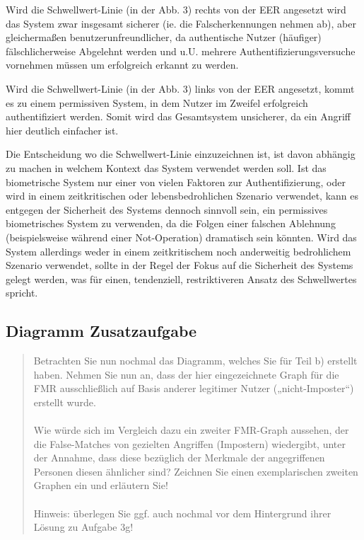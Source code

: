 \documentclass{article}
\newcommand{\annotation}[1]{
    \begin{quote}
    	\begin{textit}{#1}\end{textit}
    \end{quote}
}
\begin{document}
Wird die Schwellwert-Linie (in der Abb. 3) rechts von der EER angesetzt wird das System zwar insgesamt sicherer (ie. die
Falscherkennungen nehmen ab), aber gleichermaßen benutzerunfreundlicher, da authentische Nutzer (häufiger) 
fälschlicherweise Abgelehnt werden und u.U. mehrere Authentifizierungsversuche vornehmen müssen um erfolgreich
erkannt zu werden.

Wird die Schwellwert-Linie (in der Abb. 3) links von der EER angesetzt, kommt es zu einem permissiven System, in dem
Nutzer im Zweifel erfolgreich authentifiziert werden. Somit wird das Gesamtsystem unsicherer, da ein Angriff hier deutlich 
einfacher ist.

Die Entscheidung wo die Schwellwert-Linie einzuzeichnen ist, ist davon abhängig zu machen in welchem Kontext das System
verwendet werden soll. Ist das biometrische System nur einer von vielen Faktoren zur Authentifizierung, oder wird in einem
zeitkritischen oder lebensbedrohlichen Szenario verwendet, kann es entgegen der Sicherheit des Systems dennoch sinnvoll 
sein, ein permissives biometrisches System zu verwenden, da die Folgen einer falschen Ablehnung (beispielsweise während 
einer Not-Operation) dramatisch sein könnten. Wird das System allerdings weder in einem zeitkritischem noch anderweitig
bedrohlichem Szenario verwendet, sollte in der Regel der Fokus auf die Sicherheit des Systems gelegt werden, was für 
einen, tendenziell, restriktiveren Ansatz des Schwellwertes spricht.


\subsection{Diagramm Zusatzaufgabe}

\annotation{
    Betrachten Sie nun nochmal das Diagramm, welches Sie für Teil b) erstellt haben.
    Nehmen Sie nun an, dass der hier eingezeichnete Graph für die FMR ausschließlich
    auf Basis anderer legitimer Nutzer („nicht-Imposter“) erstellt wurde.\\\\
    Wie würde sich im Vergleich dazu ein zweiter FMR-Graph aussehen, der die
    False-Matches von gezielten Angriffen (Impostern) wiedergibt, unter der Annahme,
    dass diese bezüglich der Merkmale der angegriffenen Personen diesen ähnlicher
    sind? Zeichnen Sie einen exemplarischen zweiten Graphen ein und erläutern Sie!\\\\
    Hinweis: überlegen Sie ggf. auch nochmal vor dem Hintergrund ihrer Lösung zu Aufgabe 3g!
}
\end{document}
